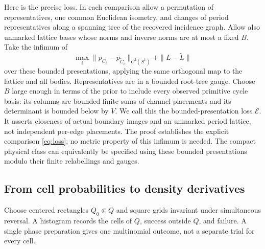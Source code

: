 Here is the precise loss. In each comparison allow a permutation of
representatives, one common Euclidean isometry, and changes of period
representatives along a spanning tree of the recovered incidence graph.
Allow also unmarked lattice bases whose norms and inverse norms are at
most a fixed $B$. Take the infimum of
\begin{equation}\label{eq:loss}
       \max_i\|p_{C_i}-p_{\widetilde C_i}\|_{C^2(S^1)}
                            +\|L-\widetilde L\|
\end{equation}
over these bounded presentations, applying the same orthogonal map to
the lattice and all bodies. Representatives are in a bounded root-tree
gauge. Choose $B$ large enough in terms of the prior to include every
observed primitive cycle basis: its columns are bounded finite sums of
channel placements and its determinant is bounded below by $V$.
We call this the bounded-presentation loss $\mathcal E$. It asserts
closeness of actual boundary images and an unmarked period lattice, not
independent per-edge placements. The proof establishes the explicit
comparison \eqref{eq:loss}; no metric property of this infimum is needed.
The compact physical class can equivalently be specified using these
bounded presentations modulo their finite relabellings and gauges.

\subsection{From cell probabilities to density derivatives}
Choose centered rectangles $Q_0\Subset Q$ and square grids invariant
under simultaneous reversal. A histogram records the cells of $Q$,
success outside $Q$, and failure. A single phase preparation gives one
multinomial outcome, not a separate trial for every cell.


